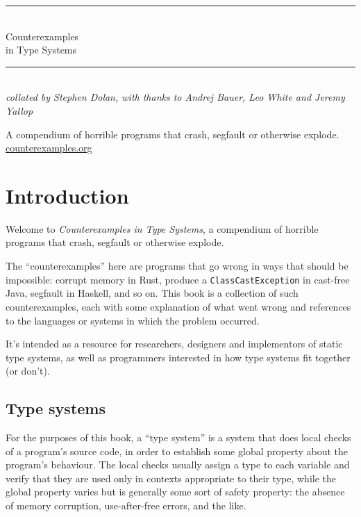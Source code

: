 \documentclass[11pt,oneside]{article}
\newcommand{\code}[1]{\texttt{#1}}
\begin{document}
\begin{titlepage}
\thispagestyle{empty}
\begin{center}
  {\color{sageline}\rule{0.55\textwidth}{0.8pt}}\\[1.7em]
  {\fontsize{30}{36}\selectfont Counterexamples\\[0.35em] in Type Systems}\\[1.5em]
  {\color{sageline}\rule{0.55\textwidth}{0.8pt}}\\[2.2em]
  {\large \emph{collated by Stephen Dolan, with thanks to Andrej Bauer, Leo White and Jeremy Yallop}}
\end{center}
\begin{center}
  \small\color{lichen}
  A compendium of horrible programs that crash, segfault or otherwise explode.\\[1.3em]
  \href{https://counterexamples.org}{counterexamples.org}
\end{center}
\end{titlepage}

\clearpage
{\hypersetup{linkcolor=ink}%
 \tableofcontents
 }
\clearpage
\section*{Introduction}
Welcome to \emph{Counterexamples in Type Systems}, a compendium of horrible programs that crash, segfault or otherwise explode.

The ``counterexamples'' here are programs that go wrong in ways that should be impossible: corrupt memory in Rust, produce a \code{ClassCastException} in cast-free Java, segfault in Haskell, and so on. This book is a collection of such counterexamples, each with some explanation of what went wrong and references to the languages or systems in which the problem occurred.

It's intended as a resource for researchers, designers and implementors of static type systems, as well as programmers interested in how type systems fit together (or don't).

\subsection*{Type systems}
For the purposes of this book, a ``type system'' is a system that does local checks of a program's source code, in order to establish some global property about the program's behaviour. The local checks usually assign a type to each variable and verify that they are used only in contexts appropriate to their type, while the global property varies but is generally some sort of safety property: the absence of memory corruption, use-after-free errors, and the like.
\end{document}
